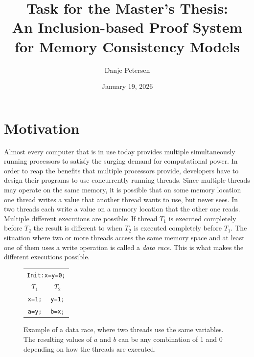 \documentclass[a4paper,11pt,twoside, english]{article}
\begin{document}
%
\thispagestyle{empty}
\title{Task for the Master's Thesis: \\ \textbf{An Inclusion-based Proof System for Memory Consistency Models}}
\author{Danje Petersen}
\date{\small January 19, 2026}

\maketitle

\thispagestyle{empty}
\section{Motivation}
Almost every computer that is in use today provides multiple simultaneously running processors to satisfy the surging demand for computational power. In order to reap the benefits that multiple processors provide, developers have to design their programs to use concurrently running threads.
Since multiple threads may operate on the same memory, it is possible that on some memory location one thread writes a value that another thread wants to use, but never sees. In  two threads each write a value on a memory location that the other one reads. Multiple different executions are possible: If thread $T_1$ is executed completely before $T_2$ the result is different to when $T_2$ is executed completely before $T_1$. The situation where two or more threads access the same memory space and at least one of them uses a write operation is called a \textit{data race}. This is what makes the different executions possible. 

\begin{figure}[h]
\centering
\begin{tabular}{c||c}
\multicolumn{2}{c}{\texttt{Init:x=y=0;}} \\[2mm]
$T_1$ & $T_2$ \\[2mm]

\texttt{x=1;} & \texttt{y=1;} \\
\texttt{a=y;} & \texttt{b=x;} \\
\end{tabular}
\caption{Example of a data race, where two threads use the same variables. The resulting values of $a$ and $b$ can be any combination of $1$ and $0$ depending on how the threads are executed.}
\label{fig:example}
\end{figure}
\end{document}
